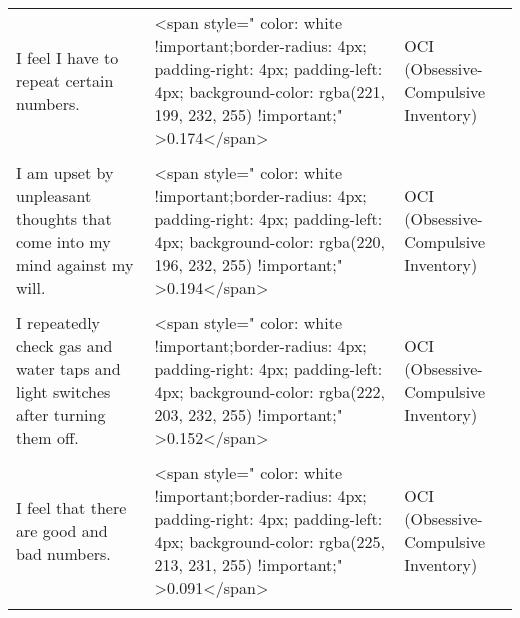 \documentclass[border=1mm]{standalone}
\begin{document}
\begin{longtable}{lll}
I feel I have to repeat certain numbers. & <span style="     color: white !important;border-radius: 4px; padding-right: 4px; padding-left: 4px; background-color: rgba(221, 199, 232, 255) !important;" >0.174</span> & OCI (Obsessive-Compulsive Inventory)\\
\cellcolor{gray!10}{I sometimes have to wash or clean myself simply because I feel contaminated.} & \cellcolor{gray!10}{<span style="     color: white !important;border-radius: 4px; padding-right: 4px; padding-left: 4px; background-color: rgba(224, 209, 231, 255) !important;" >0.114</span>} & \cellcolor{gray!10}{OCI (Obsessive-Compulsive Inventory)}\\
I am upset by unpleasant thoughts that come into my mind against my will. & <span style="     color: white !important;border-radius: 4px; padding-right: 4px; padding-left: 4px; background-color: rgba(220, 196, 232, 255) !important;" >0.194</span> & OCI (Obsessive-Compulsive Inventory)\\
\addlinespace
\cellcolor{gray!10}{I avoid throwing things away because I am afraid I might need them later.} & \cellcolor{gray!10}{<span style="     color: white !important;border-radius: 4px; padding-right: 4px; padding-left: 4px; background-color: rgba(229, 229, 229, 255) !important;" >-0.003</span>} & \cellcolor{gray!10}{OCI (Obsessive-Compulsive Inventory)}\\
I repeatedly check gas and water taps and light switches after turning them off. & <span style="     color: white !important;border-radius: 4px; padding-right: 4px; padding-left: 4px; background-color: rgba(222, 203, 232, 255) !important;" >0.152</span> & OCI (Obsessive-Compulsive Inventory)\\
\cellcolor{gray!10}{I need things to be arranged in a particular order.} & \cellcolor{gray!10}{<span style="     color: white !important;border-radius: 4px; padding-right: 4px; padding-left: 4px; background-color: rgba(228, 227, 229, 255) !important;" >-0.013</span>} & \cellcolor{gray!10}{OCI (Obsessive-Compulsive Inventory)}\\
I feel that there are good and bad numbers. & <span style="     color: white !important;border-radius: 4px; padding-right: 4px; padding-left: 4px; background-color: rgba(225, 213, 231, 255) !important;" >0.091</span> & OCI (Obsessive-Compulsive Inventory)\\
\cellcolor{gray!10}{I wash my hands more often and longer than necessary.} & \cellcolor{gray!10}{<span style="     color: white !important;border-radius: 4px; padding-right: 4px; padding-left: 4px; background-color: rgba(227, 219, 230, 255) !important;" >0.061</span>} & \cellcolor{gray!10}{OCI (Obsessive-Compulsive Inventory)}\\

\end{longtable}
\end{document}
